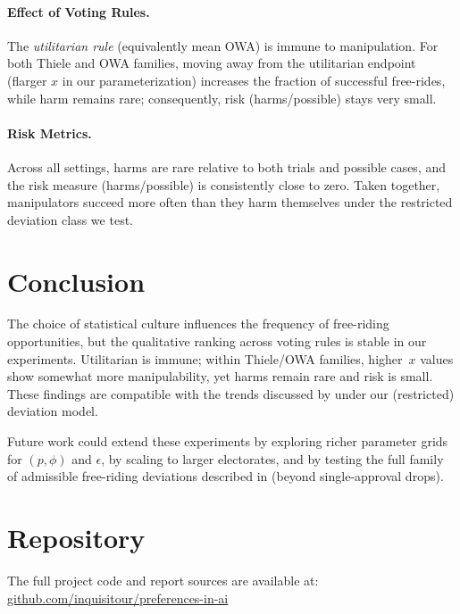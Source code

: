 \documentclass[11pt]{article}
\begin{document}
\paragraph{Effect of Voting Rules.}
The \emph{utilitarian rule} (equivalently mean OWA) is immune to manipulation.
For both Thiele and OWA families, moving away from the utilitarian endpoint
(flarger $x$ in our parameterization) increases the fraction of successful free-rides,
while harm remains rare; consequently, risk (harms/possible) stays very small.

\paragraph{Risk Metrics.}
Across all settings, harms are rare relative to both trials and possible cases,
and the risk measure (harms/possible) is consistently close to zero.
Taken together, manipulators succeed more often than they harm themselves under
the restricted deviation class we test.

\section{Conclusion}
The choice of statistical culture influences the frequency of free-riding
opportunities, but the qualitative ranking across voting rules is stable in our
experiments. Utilitarian is immune; within Thiele/OWA families, higher~$x$ values
show somewhat more manipulability, yet harms remain rare and risk is small.
These findings are compatible with the trends discussed by \cite{lackner2023freeriding}
under our (restricted) deviation model.

Future work could extend these experiments by exploring richer parameter grids
for $(p,\phi)$ and $\epsilon$, by scaling to larger electorates, and by testing
the full family of admissible free-riding deviations described in
\cite{lackner2023freeriding} (beyond single-approval drops).

\section*{Repository}
The full project code and report sources are available at: \\
\href{https://github.com/inquisitour/preferences-in-ai}{github.com/inquisitour/preferences-in-ai}



\end{document}
